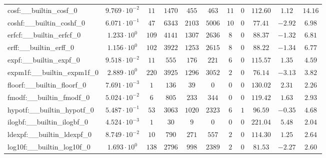 \begin{tabular}{|l|c|c|c|c|c|c|c|c|c|c|}
cosf:\_\_builtin\_cosf\_0                 & $ 9.769 \cdot 10^{-2} $ & $ 11     $ & $ 1470   $ & $ 455   $ & $ 463   $ & $ 11  $ & $ 0 $ & $ 112.60      $ & $ 1.12    $ & $ 14.16   $ \\
coshf:\_\_builtin\_coshf\_0               & $ 6.071 \cdot 10^{-1} $ & $ 47     $ & $ 6343   $ & $ 2103  $ & $ 5006  $ & $ 10  $ & $ 0 $ & $ 77.41       $ & $ -2.92   $ & $ 6.98    $ \\
erfcf:\_\_builtin\_erfcf\_0               & $ 1.233 \cdot 10^{0}  $ & $ 109    $ & $ 4141   $ & $ 1307  $ & $ 2636  $ & $ 8   $ & $ 0 $ & $ 88.37       $ & $ -1.32   $ & $ 6.81    $ \\
erff:\_\_builtin\_erff\_0                 & $ 1.156 \cdot 10^{0}  $ & $ 102    $ & $ 3922   $ & $ 1253  $ & $ 2615  $ & $ 8   $ & $ 0 $ & $ 88.22       $ & $ -1.34   $ & $ 6.77    $ \\
expf:\_\_builtin\_expf\_0                 & $ 9.518 \cdot 10^{-2} $ & $ 11     $ & $ 555    $ & $ 176   $ & $ 221   $ & $ 6   $ & $ 0 $ & $ 115.57      $ & $ 1.35    $ & $ 4.59    $ \\
expm1f:\_\_builtin\_expm1f\_0             & $ 2.889 \cdot 10^{0}  $ & $ 220    $ & $ 3925   $ & $ 1296  $ & $ 3052  $ & $ 2   $ & $ 0 $ & $ 76.14       $ & $ -3.13   $ & $ 3.82    $ \\
floorf:\_\_builtin\_floorf\_0             & $ 7.691 \cdot 10^{-3} $ & $ 1      $ & $ 136    $ & $ 39    $ & $ 0     $ & $ 0   $ & $ 0 $ & $ 130.02      $ & $ 2.31    $ & $ 2.26    $ \\
fmodf:\_\_builtin\_fmodf\_0               & $ 5.024 \cdot 10^{-2} $ & $ 6      $ & $ 805    $ & $ 233   $ & $ 344   $ & $ 0   $ & $ 0 $ & $ 119.42      $ & $ 1.63    $ & $ 2.93    $ \\
hypotf:\_\_builtin\_hypotf\_0             & $ 5.487 \cdot 10^{-1} $ & $ 53     $ & $ 3063   $ & $ 1020  $ & $ 2323  $ & $ 6   $ & $ 1 $ & $ 96.59       $ & $ -0.35   $ & $ 4.68    $ \\
ilogbf:\_\_builtin\_ilogbf\_0             & $ 4.524 \cdot 10^{-3} $ & $ 1      $ & $ 30     $ & $ 9     $ & $ 0     $ & $ 0   $ & $ 0 $ & $ 221.04      $ & $ 5.48    $ & $ 2.04    $ \\
ldexpf:\_\_builtin\_ldexpf\_0             & $ 8.749 \cdot 10^{-2} $ & $ 10     $ & $ 790    $ & $ 271   $ & $ 557   $ & $ 2   $ & $ 0 $ & $ 114.30      $ & $ 1.25    $ & $ 2.64    $ \\
log10f:\_\_builtin\_log10f\_0             & $ 1.693 \cdot 10^{0}  $ & $ 138    $ & $ 2796   $ & $ 998   $ & $ 2389  $ & $ 2   $ & $ 0 $ & $ 81.53       $ & $ -2.27   $ & $ 2.60    $ \\

\end{tabular}
